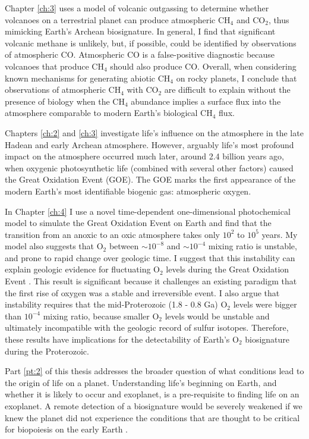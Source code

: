 Chapter \ref{ch:3} uses a model of volcanic outgassing to determine whether volcanoes on a terrestrial planet can produce atmospheric CH$_4$ and CO$_2$, thus mimicking Earth's Archean biosignature. In general, I find that significant volcanic methane is unlikely, but, if possible, could be identified by observations of atmospheric CO. Atmospheric CO is a false-positive diagnostic because volcanoes that produce CH$_4$ should also produce CO. Overall, when considering known mechanisms for generating abiotic CH$_4$ on rocky planets, I conclude that observations of atmospheric CH$_4$ with CO$_2$ are difficult to explain without the presence of biology when the CH$_4$ abundance implies a surface flux into the atmosphere comparable to modern Earth's biological CH$_4$ flux.

Chapters \ref{ch:2} and \ref{ch:3} investigate life's influence on the atmosphere in the late Hadean and early Archean atmosphere. However, arguably life's most profound impact on the atmosphere occurred much later, around 2.4 billion years ago, when oxygenic photosynthetic life (combined with several other factors) caused the Great Oxidation Event (GOE). The GOE marks the first appearance of the modern Earth's most identifiable biogenic gas: atmospheric oxygen.

In Chapter \ref{ch:4} I use a novel time-dependent one-dimensional photochemical model to simulate the Great Oxidation Event on Earth and find that the transition from an anoxic to an oxic atmosphere takes only $10^2$ to $10^5$ years. My model also suggests that O$_2$ between $\sim 10^{-8}$ and $\sim 10^{-4}$ mixing ratio is unstable, and prone to rapid change over geologic time. I suggest that this instability can explain geologic evidence for fluctuating O$_2$ levels during the Great Oxidation Event \citep{Poulton_2021}. This result is significant because it challenges an existing paradigm \citep{Goldblatt_2006} that the first rise of oxygen was a stable and irreversible event. I also argue that instability requires that the mid-Proterozoic (1.8 - 0.8 Ga) O$_2$ levels were bigger than $10^{-4}$ mixing ratio, because smaller O$_2$ levels would be unstable and ultimately incompatible with the geologic record of sulfur isotopes. Therefore, these results have implications for the detectability of Earth's O$_2$ biosignature during the Proterozoic.


Part \ref{pt:2} of this thesis addresses the broader question of what conditions lead to the origin of life on a planet. Understanding life's beginning on Earth, and whether it is likely to occur and exoplanet, is a pre-requisite to finding life on an exoplanet. A remote detection of a biosignature would be severely weakened if we knew the planet did not experience the conditions that are thought to be critical for biopoiesis on the early Earth \citep{Catling_2018}.

